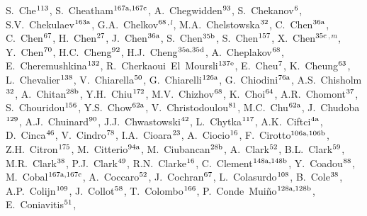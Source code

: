 \begin{flushleft}
S.~Che$^\textrm{\scriptsize 113}$,
S.~Cheatham$^\textrm{\scriptsize 167a,167c}$,
A.~Chegwidden$^\textrm{\scriptsize 93}$,
S.~Chekanov$^\textrm{\scriptsize 6}$,
S.V.~Chekulaev$^\textrm{\scriptsize 163a}$,
G.A.~Chelkov$^\textrm{\scriptsize 68}$$^{,l}$,
M.A.~Chelstowska$^\textrm{\scriptsize 32}$,
C.~Chen$^\textrm{\scriptsize 36a}$,
C.~Chen$^\textrm{\scriptsize 67}$,
H.~Chen$^\textrm{\scriptsize 27}$,
J.~Chen$^\textrm{\scriptsize 36a}$,
S.~Chen$^\textrm{\scriptsize 35b}$,
S.~Chen$^\textrm{\scriptsize 157}$,
X.~Chen$^\textrm{\scriptsize 35c}$$^{,m}$,
Y.~Chen$^\textrm{\scriptsize 70}$,
H.C.~Cheng$^\textrm{\scriptsize 92}$,
H.J.~Cheng$^\textrm{\scriptsize 35a,35d}$,
A.~Cheplakov$^\textrm{\scriptsize 68}$,
E.~Cheremushkina$^\textrm{\scriptsize 132}$,
R.~Cherkaoui~El~Moursli$^\textrm{\scriptsize 137e}$,
E.~Cheu$^\textrm{\scriptsize 7}$,
K.~Cheung$^\textrm{\scriptsize 63}$,
L.~Chevalier$^\textrm{\scriptsize 138}$,
V.~Chiarella$^\textrm{\scriptsize 50}$,
G.~Chiarelli$^\textrm{\scriptsize 126a}$,
G.~Chiodini$^\textrm{\scriptsize 76a}$,
A.S.~Chisholm$^\textrm{\scriptsize 32}$,
A.~Chitan$^\textrm{\scriptsize 28b}$,
Y.H.~Chiu$^\textrm{\scriptsize 172}$,
M.V.~Chizhov$^\textrm{\scriptsize 68}$,
K.~Choi$^\textrm{\scriptsize 64}$,
A.R.~Chomont$^\textrm{\scriptsize 37}$,
S.~Chouridou$^\textrm{\scriptsize 156}$,
Y.S.~Chow$^\textrm{\scriptsize 62a}$,
V.~Christodoulou$^\textrm{\scriptsize 81}$,
M.C.~Chu$^\textrm{\scriptsize 62a}$,
J.~Chudoba$^\textrm{\scriptsize 129}$,
A.J.~Chuinard$^\textrm{\scriptsize 90}$,
J.J.~Chwastowski$^\textrm{\scriptsize 42}$,
L.~Chytka$^\textrm{\scriptsize 117}$,
A.K.~Ciftci$^\textrm{\scriptsize 4a}$,
D.~Cinca$^\textrm{\scriptsize 46}$,
V.~Cindro$^\textrm{\scriptsize 78}$,
I.A.~Cioara$^\textrm{\scriptsize 23}$,
A.~Ciocio$^\textrm{\scriptsize 16}$,
F.~Cirotto$^\textrm{\scriptsize 106a,106b}$,
Z.H.~Citron$^\textrm{\scriptsize 175}$,
M.~Citterio$^\textrm{\scriptsize 94a}$,
M.~Ciubancan$^\textrm{\scriptsize 28b}$,
A.~Clark$^\textrm{\scriptsize 52}$,
B.L.~Clark$^\textrm{\scriptsize 59}$,
M.R.~Clark$^\textrm{\scriptsize 38}$,
P.J.~Clark$^\textrm{\scriptsize 49}$,
R.N.~Clarke$^\textrm{\scriptsize 16}$,
C.~Clement$^\textrm{\scriptsize 148a,148b}$,
Y.~Coadou$^\textrm{\scriptsize 88}$,
M.~Cobal$^\textrm{\scriptsize 167a,167c}$,
A.~Coccaro$^\textrm{\scriptsize 52}$,
J.~Cochran$^\textrm{\scriptsize 67}$,
L.~Colasurdo$^\textrm{\scriptsize 108}$,
B.~Cole$^\textrm{\scriptsize 38}$,
A.P.~Colijn$^\textrm{\scriptsize 109}$,
J.~Collot$^\textrm{\scriptsize 58}$,
T.~Colombo$^\textrm{\scriptsize 166}$,
P.~Conde~Mui\~no$^\textrm{\scriptsize 128a,128b}$,
E.~Coniavitis$^\textrm{\scriptsize 51}$,

\end{flushleft}
